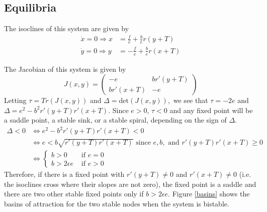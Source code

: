 \documentclass{article}
\begin{document}
\subsection{Equilibria }
The isoclines of this system are given by
\begin{align*}
\dot{x}=0 \Rightarrow x&=\frac{f}{e}+\frac{b}{e}r(y+T) 
\\\dot{y}=0 \Rightarrow y&=-\frac{f}{e}+\frac{b}{e}r(x+T)
\end{align*}

The Jacobian of this system is given by
$$J(x,y)=\left(\begin{array}{cccc} 
-e & br'(y+T)
\\ br'(x+T) & -e
\end{array}\right)$$
Letting $\tau=Tr(J(x,y))$ and $\Delta=\text{det}(J(x,y)),$ we see that $\tau=-2e$ and $\Delta=e^2-b^2r'(y+T)r'(x+T)$.  Since $e>0$, $\tau<0$ and any fixed point will be a saddle point, a stable sink, or a stable spiral, depending on the sign of $\Delta$.  
\begin{align*}
\Delta<0 &\Leftrightarrow e^2-b^2r'(y+T)r'(x+T)<0 
\\&\Leftrightarrow e<b\sqrt{r'(y+T)r'(x+T)} \text{ since } e,b, \text{ and } r'(y+T)r'(x+T)\geq0
\\ &\Leftrightarrow \left\{\begin{array}{cccc}
b>0 & \text{ if } e=0
\\ b>2\epsilon e & \text{ if } e>0
\end{array}\right.
\end{align*}
Therefore, if there is a fixed point with $r'(y+T)\neq 0$ and $r'(x+T)\neq 0$ (i.e. the isoclines cross where their slopes are not zero), the fixed point is a saddle and there are two other stable fixed points only if $b>2\epsilon e$.  Figure \ref{basins} shows the basins of attraction for the two stable nodes when the system is bistable.  
\end{document}
